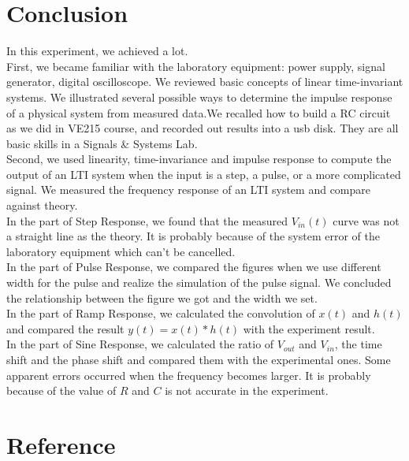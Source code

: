 \documentclass{article}
\begin{document}
\section{Conclusion}

In this experiment, we achieved a lot.\\

First, we became familiar with the laboratory equipment: power supply, signal generator, digital oscilloscope. We reviewed basic concepts of linear time-invariant systems. We illustrated several possible ways to determine the impulse response of a physical system from measured data.We recalled how to build a RC circuit as we did in VE215 course, and recorded out results into a usb disk. They are all basic skills in a Signals \& Systems Lab.\\

Second, we used linearity, time-invariance and impulse response to compute the output of an LTI system when the input is a step, a pulse, or a more complicated signal. We measured the frequency response of an LTI system and compare against theory.\\

In the part of Step Response, we found that the measured $V_{in}(t)$ curve was not a straight line as the theory. It is probably because of the system error of the laboratory equipment which can't be cancelled. \\

In the part of Pulse Response, we compared the figures when we use different width for the pulse and realize the simulation of the pulse signal. We concluded the relationship between the figure we got and the width we set.\\

In the part of Ramp Response, we calculated the convolution of $x(t)$ and $h(t)$ and compared the result $y(t)=x(t)*h(t)$ with the experiment result.\\

In the part of Sine Response, we calculated the ratio of $V_{out}$ and $V_{in}$, the time shift and the phase shift and compared them with the experimental ones. Some apparent errors occurred when the frequency becomes larger. It is probably because of the value of $R$ and $C$ is not accurate in the experiment.

\section{Reference}
\end{document}
